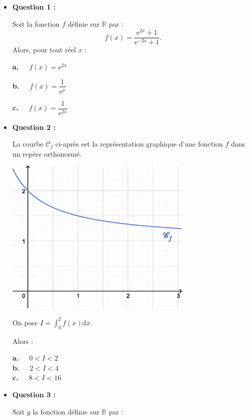 \begin{itemize}
     \item \textbf{Question 1 :}
     \par
     Soit la fonction $f$ définie sur $\mathbb{R}$ par :
     \[ f(x)=\dfrac{\text{e}^{2x}+1}{\text{e}^{-2x}+1}. \]
     Alors, pour tout réel $x$ :
     \par
     \textbf{a.~~} $f(x)=\text{e}^{2x}$
     \par
     \textbf{b.~~}  $f(x)=\dfrac{1}{\text{e}^{x}}$
     \par
     \textbf{c.~~}  $f(x)=\dfrac{1}{\text{e}^{2x}}$
     \par
\medskip
     \item \textbf{Question 2 :}
     \par
     La courbe $\mathscr{C}_f$ ci-après est la représentation graphique d'une fonction $f$ dans un repère orthonormé.
     \begin{center}
          \begin{extern}%
               \includegraphics[width=0.7\textwidth]{images/BBESL-s4-1-1}%
          \end{extern}
     \end{center}
     On pose $I= \displaystyle\int_{0}^{2}f(x)\text{d}x$.
     \par
     Alors :
     \par
     \textbf{a.~~} $0 < I < 2$ \\
     \textbf{b.~~} $2 < I < 4$ \\
     \textbf{c.~~} $8 < I < 16$ \\
     \item \textbf{Question 3 :}
     \par
     Soit $g$ la fonction définie sur $\mathbb{R}$ par :

\end{itemize}
